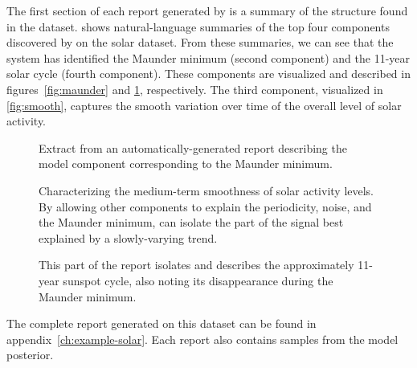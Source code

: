 The first section of each report generated by \procedurename{} is a summary of the structure found in the dataset.
 shows natural-language summaries of the top four components discovered by \procedurename{} on the solar dataset.
From these summaries, we can see that the system has identified the Maunder minimum (second component) and the 11-year solar cycle (fourth component).
These components are visualized and described in figures~\ref{fig:maunder} and \ref{fig:periodic}, respectively. 
The third component, visualized in \cref{fig:smooth}, captures the smooth variation over time of the overall level of solar activity.

\begin{figure}[]%
\centering
{}
\caption[A component corresponding to the Maunder minimum]
{Extract from an automatically-generated report describing the model component corresponding to the Maunder minimum.}
\label{fig:maunder}
%
\centering
{}
\caption[\procedurename{} isolating part of the signal explained by a slowly-varying trend]
{Characterizing the medium-term smoothness of solar activity levels.
By allowing other components to explain the periodicity, noise, and the Maunder minimum, \procedurename{} can isolate the part of the signal best explained by a slowly-varying trend.}
\label{fig:smooth}
%
\centering
{}
\caption[Automatic description of the solar cycle]
{
This part of the report isolates and describes the approximately 11-year sunspot cycle, also noting its disappearance during the Maunder minimum.}
\label{fig:periodic}
\end{figure}
%
The complete report generated on this dataset can be found in appendix~\ref{ch:example-solar}.
Each report also contains samples from the model posterior.


